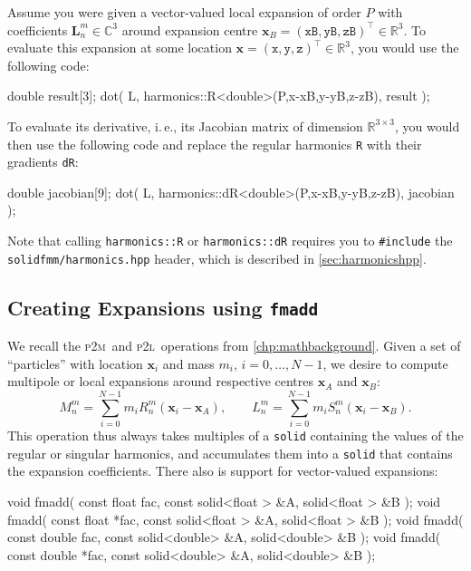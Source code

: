 \documentclass{scrbook}
\newcommand{\PtoM}{\textsc{p2m}}
\newcommand{\PtoL}{\textsc{p2l}}
\newcommand{\reals}{\ensuremath{\mathbb{R}}}
\newcommand{\complex}{\mathbb{C}}
\newcommand{\vv}[1]{\ensuremath{\symbf{#1}}} %
\begin{document}
Assume you were given a vector-valued local expansion of order $P$ with
coefficients $\vv{L}_n^m\in\complex^3$ around expansion centre $\vv{x}_B=
(\mathtt{xB},\mathtt{yB},\mathtt{zB})^\top\in\reals^3$. To evaluate this
expansion at some location 
$\vv{x}=(\mathtt{x},\mathtt{y},\mathtt{z})^\top\in\reals^3$, you would use
the following code:
\begin{cppcode*}
double result[3];
dot( L, harmonics::R<double>(P,x-xB,y-yB,z-zB), result ); 
\end{cppcode*}
To evaluate its derivative, i.\,e., its Jacobian matrix of dimension
$\reals^{3\times 3}$, you would then use the following code and 
replace the regular harmonics \lstinline|R| with their gradients \lstinline|dR|:
\begin{cppcode*}
double jacobian[9];
dot( L, harmonics::dR<double>(P,x-xB,y-yB,z-zB), jacobian );
\end{cppcode*}
Note that calling \lstinline|harmonics::R| or \lstinline|harmonics::dR| requires
you to \lstinline[style=cpp]|#include| the \lstinline|solidfmm/harmonics.hpp|
header, which is described in \cref{sec:harmonicshpp}.

\subsection{Creating Expansions using \texttt{fmadd}}
We recall the \PtoM\ and \PtoL\ operations from \cref{chp:mathbackground}.
Given a set of \enquote{particles} with location $\vv{x}_i$ and mass $m_i$,
$i=0,\dotsc,N-1$, we desire to compute multipole or local
expansions around respective centres $\vv{x}_A$ and $\vv{x}_B$:
\begin{equation}
M_n^m = \sum_{i=0}^{N-1}m_i R_n^m(\vv{x}_i-\vv{x}_A),\qquad
L_n^m = \sum_{i=0}^{N-1}m_i S_n^m(\vv{x}_i-\vv{x}_B).
\end{equation}
This operation thus always takes multiples of a \lstinline|solid| containing the
values of the regular or singular harmonics, and accumulates them into a
\lstinline|solid| that contains the expansion coefficients. There also is
support for vector-valued expansions:
\begin{cppcode*}
void fmadd( const float   fac, const solid<float > &A, solid<float > &B );
void fmadd( const float  *fac, const solid<float > &A, solid<float > &B );
void fmadd( const double  fac, const solid<double> &A, solid<double> &B );
void fmadd( const double *fac, const solid<double> &A, solid<double> &B );
\end{cppcode*}
\end{document}
